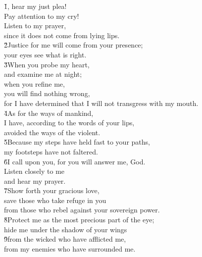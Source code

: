 \begin{poetry}
\poeml \v{1}, hear my just plea! \\
\poemll    Pay attention to my cry! \\
\poeml Listen to my prayer, \\
\poemll    since it does not come from lying lips. \\
\poeml \v{2}Justice for me will come from your presence; \\
\poemll    your eyes see what is right. \\
\poeml \v{3}When you probe my heart, \\
\poemll    and examine me at night; \\
\poeml when you refine me, \\
\poemll    you will find nothing wrong, \\
\poemlll       for I have determined that I will not transgress with my mouth. \\
\poeml \v{4}As for the ways of mankind, \\
\poemll    I have, according to the words of your lips, \\
\poemlll       avoided the ways of the violent. \\
\poeml \v{5}Because my steps have held fast to your paths, \\
\poemll    my footsteps have not faltered. \\
\poeml \v{6}I call upon you, for you will answer me, God. \\
\poemll    Listen closely to me \\
\poemlll       and hear my prayer. \\
\poeml \v{7}Show forth your gracious love, \\
\poemll    save those who take refuge in you \\
\poemlll       from those who rebel against your sovereign power. \\
\poeml \v{8}Protect me as the most precious part of the eye; \\
\poemll    hide me under the shadow of your wings \\
\poeml \v{9}from the wicked who have afflicted me, \\
\poemll    from my enemies who have surrounded me. \\

\end{poetry}
